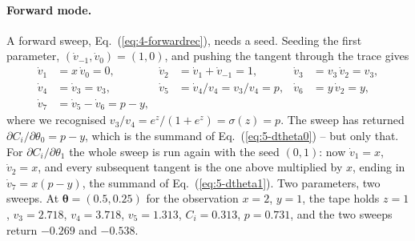 \paragraph{Forward mode.}
A forward sweep, Eq.~(\ref{eq:4-forwardrec}), needs a seed.  Seeding the
first parameter, $(\dot v_{-1},\dot v_0)=(1,0)$, and pushing the tangent
through the trace gives
\begin{equation}
  \begin{aligned}
    \dot v_1 &= x\,\dot v_0 = 0, &
    \dot v_2 &= \dot v_1+\dot v_{-1} = 1, &
    \dot v_3 &= v_3\,\dot v_2 = v_3, \\
    \dot v_4 &= \dot v_3 = v_3, &
    \dot v_5 &= \dot v_4/v_4 = v_3/v_4 = p, &
    \dot v_6 &= y\,\dot v_2 = y, \\
    \dot v_7 &= \dot v_5-\dot v_6 = p-y ,
  \end{aligned}
  \label{eq:5-adforward}
\end{equation}
where we recognised $v_3/v_4=e^{z}/(1+e^{z})=\sigma(z)=p$.  The sweep has
returned $\partial C_i/\partial\theta_0=p-y$, which is the summand of
Eq.~(\ref{eq:5-dtheta0}) -- but only that.  For $\partial C_i/\partial\theta_1$
the whole sweep is run again with the seed $(0,1)$: now $\dot v_1=x$,
$\dot v_2=x$, and every subsequent tangent is the one above multiplied by
$x$, ending in $\dot v_7=x(p-y)$, the summand of Eq.~(\ref{eq:5-dtheta1}).
Two parameters, two sweeps.  At $\bm{\theta}=(0.5,0.25)$ for the observation
$x=2$, $y=1$, the tape holds $z=1$, $v_3=2.718$, $v_4=3.718$, $v_5=1.313$,
$C_i=0.313$, $p=0.731$, and the two sweeps return $-0.269$ and $-0.538$.

